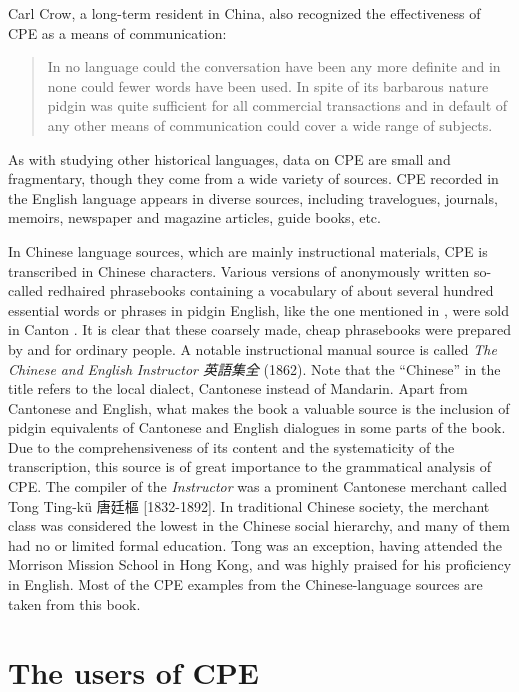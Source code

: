 \documentclass[output=paper]{langsci/langscibook}
\begin{document}
Carl Crow, a long-term resident in China, also recognized the effectiveness of CPE as a means of communication:

\begin{quote}
    In no language could the conversation have been any more definite and in none could fewer words have been used. In spite of its barbarous nature pidgin was quite sufficient for all commercial transactions and in default of any other means of communication could cover a wide range of subjects. \citep[31]{crow_foreign_2011}
\end{quote}

As with studying other historical languages, data on CPE are small and fragmentary, though they come from a wide variety of sources. CPE recorded in the English language appears in diverse sources, including travelogues, journals, memoirs, newspaper and magazine articles, guide books, etc.

In Chinese language sources, which are mainly instructional materials, CPE is transcribed in Chinese characters. Various versions of anonymously written so-called redhaired phrasebooks containing a vocabulary of about several hundred essential words or phrases in pidgin English, like the one mentioned in \citet{hunter_fan_1882}, were sold in Canton \citep{bolton_chinese_2003}. It is clear that these coarsely made, cheap phrasebooks were prepared by and for ordinary people. A notable instructional manual source is called \textit{The} \textit{Chinese} \textit{and} \textit{English} \textit{Instructor 英語集全} (1862). Note that the “Chinese” in the title refers to the local dialect, Cantonese instead of Mandarin. Apart from Cantonese and English, what makes the book a valuable source is the inclusion of pidgin equivalents of Cantonese and English dialogues in some parts of the book. Due to the comprehensiveness of its content and the systematicity of the transcription, this source is of great importance to the grammatical analysis of CPE. The compiler of the \textit{Instructor} was a prominent Cantonese merchant called Tong Ting-kü 唐廷樞 [1832-1892]. In traditional Chinese society, the merchant class was considered the lowest in the Chinese social hierarchy, and many of them had no or limited formal education. Tong was an exception, having attended the Morrison Mission School in Hong Kong, and was highly praised for his proficiency in English. Most of the CPE examples from the Chinese-language sources are taken from this book.

\section{The users of CPE}
\end{document}

